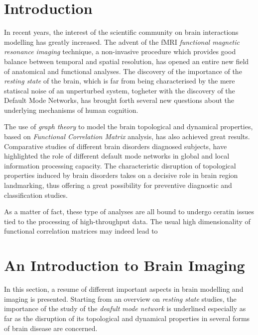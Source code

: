 \documentclass[12pt,openright,twoside,a4paper]{book}
\begin{document}
\frontmatter

\tableofcontents

\chapter{Introduction}

In recent years, the  interest of the scientific community on brain interactions modelling has greatly increased.
The advent of the fMRI \textit{functional magnetic resonance imaging} technique, a non-invasive procedure which provides good balance between temporal and spatial resolution, has opened an entire new field of anatomical and functional analyses.
The discovery of the importance of the \textit{resting state} of the brain, which is far from being characterised by the mere statiscal noise of an unperturbed system, togheter with the discovery of the Default Mode Networks, has brought forth several new questions about the underlying mechanisms of human cognition.

The use of \textit{graph theory} to model the brain topological and dynamical properties, based on \textit{Functional Correlation Matrix} analysis, has also achieved great results.
Comparative studies of different brain disorders diagnosed subjects, have highlighted the role of different default mode networks in global and local information processing capacity.
The characteristic disruption of topological properties induced by brain disorders takes on a decisive role in brain region landmarking, thus offering a great possibility for preventive diagnostic and classification studies.

As a matter of fact, these type of analyses are all bound to undergo ceratin issues tied to the  processing of high-throughput data.
The usual high dimensionality of functional correlation matrices may indeed lead to


\mainmatter

\chapter{An Introduction to Brain Imaging}

In this section, a resume of different important aspects in brain modelling and imaging is presented.
Starting from an overview on \textit{resting state} studies, the importance of the study of the \textit{deafult mode network} is underlined especially as far as the disruption of its topological and dynamical properties in several forms of brain disease are concerned.
\end{document}

